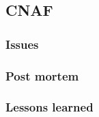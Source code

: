 
\subsection{CNAF}
\label{sec:site:cnaf}

\subsubsection{Issues}
\label{sec:site:cnaf:Issues}

\subsubsection{Post mortem}
\label{sec:site:cnaf:postmortem}

\subsubsection{Lessons learned}
\label{sec:site:cnaf:lessons}
